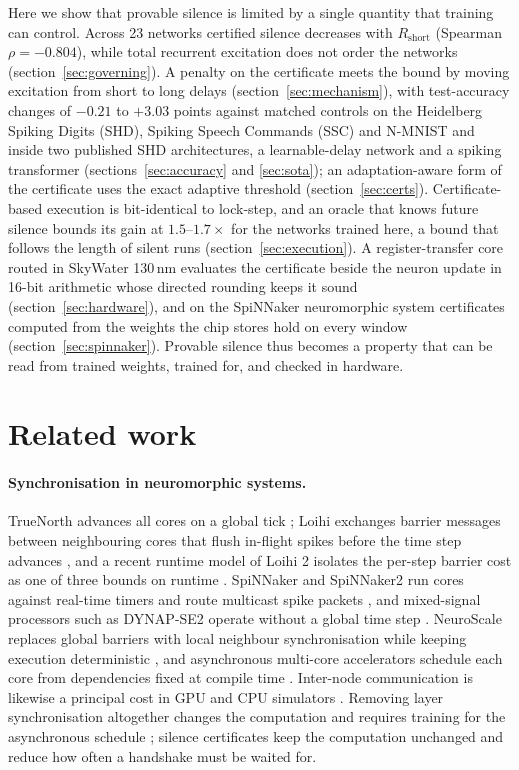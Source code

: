 \documentclass{iopjournal}
\begin{document}
Here we show that provable silence is limited by a single quantity that training can control. Across 23 networks certified silence decreases with $R_{\mathrm{short}}$ (Spearman $\rho=-0.804$), while total recurrent excitation does not order the networks (section~\ref{sec:governing}). A penalty on the certificate meets the bound by moving excitation from short to long delays (section~\ref{sec:mechanism}), with test-accuracy changes of $-0.21$ to $+3.03$ points against matched controls on the Heidelberg Spiking Digits (SHD), Spiking Speech Commands (SSC) and N-MNIST and inside two published SHD architectures, a learnable-delay network and a spiking transformer (sections~\ref{sec:accuracy} and \ref{sec:sota}); an adaptation-aware form of the certificate uses the exact adaptive threshold (section~\ref{sec:certs}). Certificate-based execution is bit-identical to lock-step, and an oracle that knows future silence bounds its gain at $1.5$--$1.7\times$ for the networks trained here, a bound that follows the length of silent runs (section~\ref{sec:execution}). A register-transfer core routed in SkyWater 130\,nm evaluates the certificate beside the neuron update in 16-bit arithmetic whose directed rounding keeps it sound (section~\ref{sec:hardware}), and on the SpiNNaker neuromorphic system certificates computed from the weights the chip stores hold on every window (section~\ref{sec:spinnaker}). Provable silence thus becomes a property that can be read from trained weights, trained for, and checked in hardware.

\section{Related work}

\paragraph{Synchronisation in neuromorphic systems.} TrueNorth advances all cores on a global tick \cite{truenorth}; Loihi exchanges barrier messages between neighbouring cores that flush in-flight spikes before the time step advances \cite{loihi}, and a recent runtime model of Loihi 2 isolates the per-step barrier cost as one of three bounds on runtime \cite{loihi2runtime}. SpiNNaker and SpiNNaker2 run cores against real-time timers and route multicast spike packets \cite{spinnaker,spinnaker2chip}, and mixed-signal processors such as DYNAP-SE2 operate without a global time step \cite{dynapse2}. NeuroScale replaces global barriers with local neighbour synchronisation while keeping execution deterministic \cite{neuroscale}, and asynchronous multi-core accelerators schedule each core from dependencies fixed at compile time \cite{asyncaccel}. Inter-node communication is likewise a principal cost in GPU and CPU simulators \cite{golosio2026,pronold2022,kurth2022,senk2026}. Removing layer synchronisation altogether changes the computation and requires training for the asynchronous schedule \cite{layersync}; silence certificates keep the computation unchanged and reduce how often a handshake must be waited for.
\end{document}
